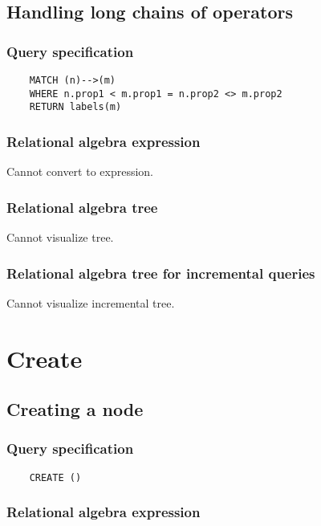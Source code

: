 	\subsection{Handling long chains of operators}

	\subsubsection*{Query specification}

	\begin{lstlisting}
	MATCH (n)-->(m)
	WHERE n.prop1 < m.prop1 = n.prop2 <> m.prop2
	RETURN labels(m)
	\end{lstlisting}


	\subsubsection*{Relational algebra expression}

	Cannot convert to expression.

	\subsubsection*{Relational algebra tree}

	Cannot visualize tree.

	\subsubsection*{Relational algebra tree for incremental queries}

	Cannot visualize incremental tree.

	\section{Create}

	\subsection{Creating a node}

	\subsubsection*{Query specification}

	\begin{lstlisting}
	CREATE ()
	\end{lstlisting}


	\subsubsection*{Relational algebra expression}

